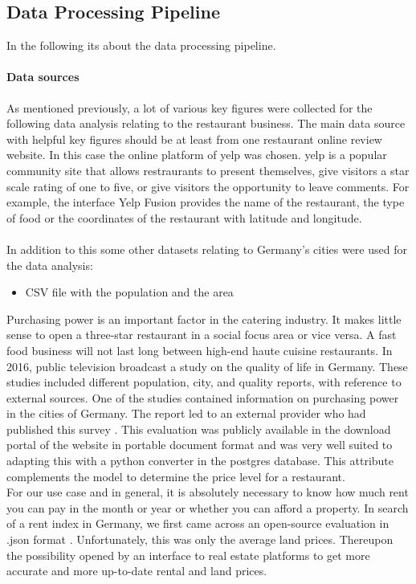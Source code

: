 \subsection{Data Processing Pipeline}
\label{subsec:pipeline}
In the following its about the data processing pipeline.

\paragraph{Data sources}
\label{subsec:Data sources}
As mentioned previously, a lot of various key figures were collected for the following data analysis relating to the restaurant business. The main data source with helpful key figures should be at least from one restaurant online review website. In this case the online platform of yelp was chosen. yelp is a popular community site that allows restraurants to present themselves, give visitors a star scale rating of one to five, or give visitors the opportunity to leave comments. For example, the interface Yelp Fusion provides the name of the restaurant, the type of food or the coordinates of the restaurant with latitude and longitude. \\
\\
In addition to this some other datasets relating to Germany's cities were used for the data analysis:
\begin{itemize}
\item CSV file with the population and the area
\end{itemize}

Purchasing power is an important factor in the catering industry. It makes little sense to open a three-star restaurant in a social focus area or vice versa. A fast food business will not last long between high-end haute cuisine restaurants. In 2016, public television broadcast a study on the quality of life in Germany. These studies included different population, city, and quality reports, with reference to external sources. One of the studies contained information on purchasing power in the cities of Germany. The report led to an external provider who had published this survey \cite{BuyingPower}. This evaluation was publicly available in the download portal of the website in portable document format and was very well suited to adapting this with a python converter in the postgres database. This attribute complements the model to determine the price level for a restaurant.
\\
For our use case and in general, it is absolutely necessary to know how much rent you can pay in the month or year or whether you can afford a property. In search of a rent index in Germany, we first came across an open-source evaluation in .json format \cite{Sparda}. Unfortunately, this was only the average land prices. Thereupon the possibility opened by an interface to real estate platforms \cite{ImmoScout} to get more accurate and more up-to-date rental and land prices.
